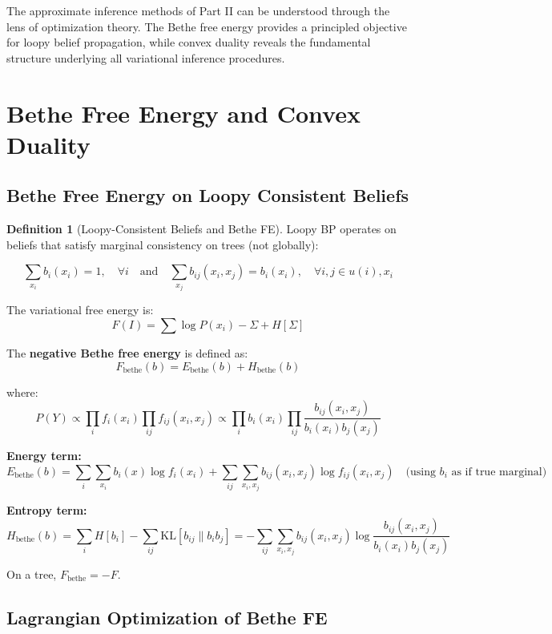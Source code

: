\documentclass[12pt,a4paper]{article}
\theoremstyle{definition}
\newtheorem{definition}{Definition}[section]
\begin{document}
The approximate inference methods of Part II can be understood through the lens of optimization theory. The Bethe free energy provides a principled objective for loopy belief propagation, while convex duality reveals the fundamental structure underlying all variational inference procedures.

\newpage

\section{Bethe Free Energy and Convex Duality}

\subsection{Bethe Free Energy on Loopy Consistent Beliefs}

\begin{definition}[Loopy-Consistent Beliefs and Bethe FE]
Loopy BP operates on beliefs that satisfy marginal consistency on trees (not globally):

\[
\sum_{x_i} b_i(x_i) = 1, \quad \forall i \quad \text{and} \quad \sum_{x_j} b_{ij}(x_i, x_j) = b_i(x_i), \quad \forall i, j \in u(i), x_i
\]

The variational free energy is:
\[
F(I) = \sum \log P(x_i) - \Sigma + H[\Sigma]
\]

The \textbf{negative Bethe free energy} is defined as:
\[
F_{\text{bethe}}(b) = E_{\text{bethe}}(b) + H_{\text{bethe}}(b)
\]

where:
\[
P(Y) \propto \prod_i f_i(x_i) \prod_{ij} f_{ij}(x_i, x_j) \propto \prod_i b_i(x_i) \prod_{ij} \frac{b_{ij}(x_i, x_j)}{b_i(x_i) b_j(x_j)}
\]

\textbf{Energy term:}
\[
E_{\text{bethe}}(b) = \sum_i \sum_{x_i} b_i(x) \log f_i(x_i) + \sum_{ij} \sum_{x_i, x_j} b_{ij}(x_i, x_j) \log f_{ij}(x_i, x_j) \quad \text{(using } b_i \text{ as if true marginal)}
\]

\textbf{Entropy term:}
\[
H_{\text{bethe}}(b) = \sum_i H[b_i] - \sum_{ij} \text{KL}[b_{ij} \| b_i b_j] = -\sum_{ij} \sum_{x_i, x_j} b_{ij}(x_i, x_j) \log \frac{b_{ij}(x_i, x_j)}{b_i(x_i) b_j(x_j)}
\]

On a tree, $F_{\text{bethe}} = -F$.
\end{definition}

\subsection{Lagrangian Optimization of Bethe FE}
\end{document}
